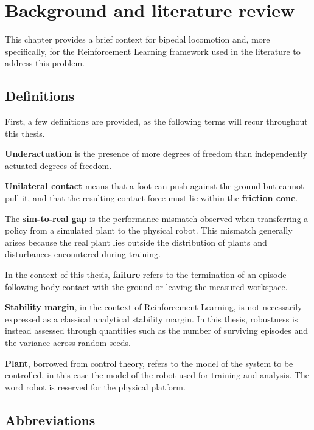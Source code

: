 \section{Background and literature review}

\label{sec:bg}

This chapter provides a brief context for bipedal locomotion and, more specifically, for the Reinforcement Learning framework used in the literature to address this problem.

\subsection{Definitions}

\label{sec:bg-defs}

First, a few definitions are provided, as the following terms will recur throughout this thesis.

\textbf{Underactuation} is the presence of more degrees of freedom than independently actuated degrees of freedom.

\textbf{Unilateral contact} means that a foot can push against the ground but cannot pull it, and that the resulting contact force must lie within the \textbf{friction cone}.

The \textbf{sim-to-real gap} is the performance mismatch observed when transferring a policy from a simulated plant to the physical robot. This mismatch generally arises because the real plant lies outside the distribution of plants and disturbances encountered during training.

In the context of this thesis, \textbf{failure} refers to the termination of an episode following body contact with the ground or leaving the measured workspace.

\textbf{Stability margin}, in the context of Reinforcement Learning, is not necessarily expressed as a classical analytical stability margin. In this thesis, robustness is instead assessed through quantities such as the number of surviving episodes and the variance across random seeds.

\textbf{Plant}, borrowed from control theory, refers to the model of the system to be controlled, in this case the model of the robot used for training and analysis. The word robot is reserved for the physical platform.

\subsection{Abbreviations}

